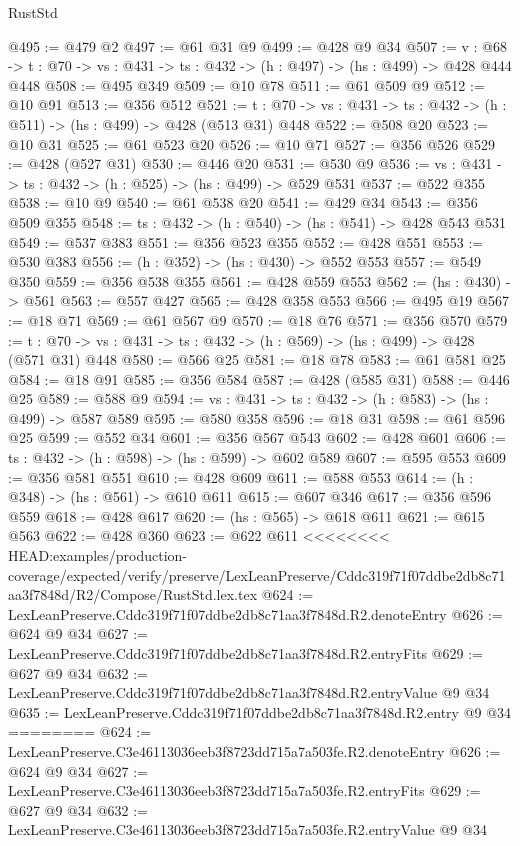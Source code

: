 \begin{lexlean}{RustStd}
\begin{coremodule}
{\begin{coremodule}
@495 := @479 @2
@497 := @61 @31 @9
@499 := @428 @9 @34
@507 := {v : @68} ->
  {t : @70} -> {vs : @431} -> {ts : @432} -> (h : @497) -> (hs : @499) -> @428 @444 @448
@508 := @495 @349
@509 := @10 @78
@511 := @61 @509 @9
@512 := @10 @91
@513 := @356 @512
@521 := {t : @70} -> {vs : @431} -> {ts : @432} -> (h : @511) -> (hs : @499) -> @428 (@513 @31) @448
@522 := @508 @20
@523 := @10 @31
@525 := @61 @523 @20
@526 := @10 @71
@527 := @356 @526
@529 := @428 (@527 @31)
@530 := @446 @20
@531 := @530 @9
@536 := {vs : @431} -> {ts : @432} -> (h : @525) -> (hs : @499) -> @529 @531
@537 := @522 @355
@538 := @10 @9
@540 := @61 @538 @20
@541 := @429 @34
@543 := @356 @509 @355
@548 := {ts : @432} -> (h : @540) -> (hs : @541) -> @428 @543 @531
@549 := @537 @383
@551 := @356 @523 @355
@552 := @428 @551
@553 := @530 @383
@556 := (h : @352) -> (hs : @430) -> @552 @553
@557 := @549 @350
@559 := @356 @538 @355
@561 := @428 @559 @553
@562 := (hs : @430) -> @561
@563 := @557 @427
@565 := @428 @358 @553
@566 := @495 @19
@567 := @18 @71
@569 := @61 @567 @9
@570 := @18 @76
@571 := @356 @570
@579 := {t : @70} -> {vs : @431} -> {ts : @432} -> (h : @569) -> (hs : @499) -> @428 (@571 @31) @448
@580 := @566 @25
@581 := @18 @78
@583 := @61 @581 @25
@584 := @18 @91
@585 := @356 @584
@587 := @428 (@585 @31)
@588 := @446 @25
@589 := @588 @9
@594 := {vs : @431} -> {ts : @432} -> (h : @583) -> (hs : @499) -> @587 @589
@595 := @580 @358
@596 := @18 @31
@598 := @61 @596 @25
@599 := @552 @34
@601 := @356 @567 @543
@602 := @428 @601
@606 := {ts : @432} -> (h : @598) -> (hs : @599) -> @602 @589
@607 := @595 @553
@609 := @356 @581 @551
@610 := @428 @609
@611 := @588 @553
@614 := (h : @348) -> (hs : @561) -> @610 @611
@615 := @607 @346
@617 := @356 @596 @559
@618 := @428 @617
@620 := (hs : @565) -> @618 @611
@621 := @615 @563
@622 := @428 @360
@623 := @622 @611
<<<<<<<< HEAD:examples/production-coverage/expected/verify/preserve/LexLeanPreserve/Cddc319f71f07ddbe2db8c71aa3f7848d/R2/Compose/RustStd.lex.tex
@624 := LexLeanPreserve.Cddc319f71f07ddbe2db8c71aa3f7848d.R2.denoteEntry
@626 := @624 @9 @34
@627 := LexLeanPreserve.Cddc319f71f07ddbe2db8c71aa3f7848d.R2.entryFits
@629 := @627 @9 @34
@632 := LexLeanPreserve.Cddc319f71f07ddbe2db8c71aa3f7848d.R2.entryValue @9 @34
@635 := LexLeanPreserve.Cddc319f71f07ddbe2db8c71aa3f7848d.R2.entry @9 @34
========
@624 := LexLeanPreserve.C3e46113036eeb3f8723dd715a7a503fe.R2.denoteEntry
@626 := @624 @9 @34
@627 := LexLeanPreserve.C3e46113036eeb3f8723dd715a7a503fe.R2.entryFits
@629 := @627 @9 @34
@632 := LexLeanPreserve.C3e46113036eeb3f8723dd715a7a503fe.R2.entryValue @9 @34

\end{coremodule}}
\end{coremodule}
\end{lexlean}
